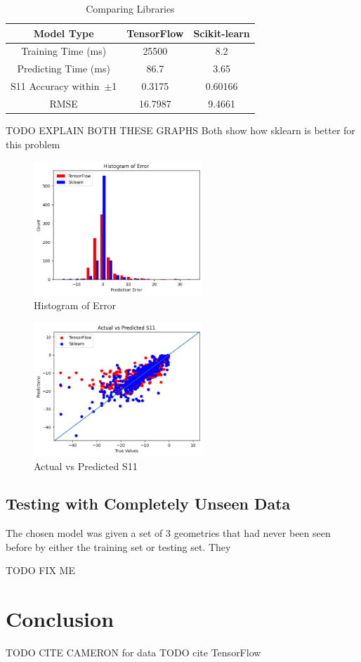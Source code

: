 \documentclass[lettersize,journal]{IEEEtran}
\begin{document}
\begin{table}
\caption{Comparing Libraries}
\begin{center}
\begin{tabular}{ |c|c|c| }
    \hline
    Model Type & TensorFlow & Scikit-learn \\ 
    \hline
    Training Time (ms) & 25500 & 8.2 \\  
    \hline
    Predicting Time (ms) & 86.7 & 3.65 \\
    \hline
    S11 Accuracy within~$\pm$1 & 0.3175 & 0.60166 \\
    \hline
    RMSE & 16.7987 & 9.4661 \\
    \hline
\end{tabular}
\end{center}
\end{table}

TODO EXPLAIN BOTH THESE GRAPHS
Both show how sklearn is better for this problem

\begin{figure}[!t]
    \centering
    \includegraphics[width=2.5in]{histogram}
    \caption{Histogram of Error}
    \label{fig_sim}
    \end{figure}

\begin{figure}[!t]
    \centering
    \includegraphics[width=2.5in]{actual_vs_predicted_s11}
    \caption{Actual vs Predicted S11}
    \label{fig_sim}
    \end{figure}

\subsection{Testing with Completely Unseen Data}
The chosen model was given a set of 3 geometries that had never been seen before by either the training set or testing set. They 

TODO FIX ME 


\section{Conclusion}

TODO CITE CAMERON for data
TODO cite TensorFlow





\vfill
\end{document}
